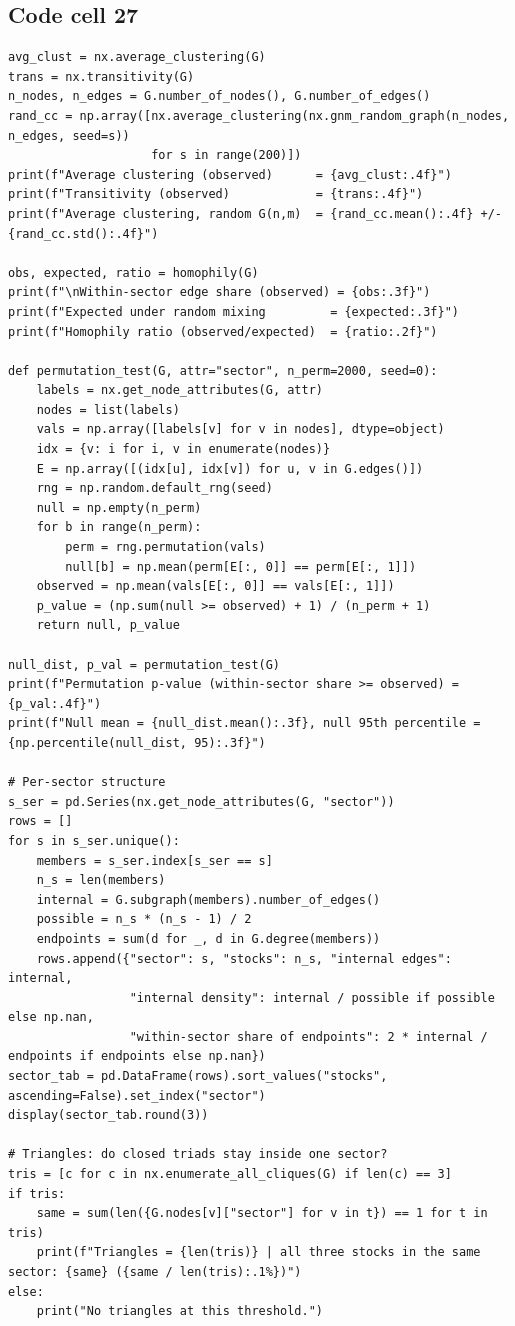 \documentclass[12pt,a4paper]{report}
\begin{document}
\subsection*{Code cell 27}
\begin{lstlisting}[style=fancy]
avg_clust = nx.average_clustering(G)
trans = nx.transitivity(G)
n_nodes, n_edges = G.number_of_nodes(), G.number_of_edges()
rand_cc = np.array([nx.average_clustering(nx.gnm_random_graph(n_nodes, n_edges, seed=s))
                    for s in range(200)])
print(f"Average clustering (observed)      = {avg_clust:.4f}")
print(f"Transitivity (observed)            = {trans:.4f}")
print(f"Average clustering, random G(n,m)  = {rand_cc.mean():.4f} +/- {rand_cc.std():.4f}")

obs, expected, ratio = homophily(G)
print(f"\nWithin-sector edge share (observed) = {obs:.3f}")
print(f"Expected under random mixing         = {expected:.3f}")
print(f"Homophily ratio (observed/expected)  = {ratio:.2f}")

def permutation_test(G, attr="sector", n_perm=2000, seed=0):
    labels = nx.get_node_attributes(G, attr)
    nodes = list(labels)
    vals = np.array([labels[v] for v in nodes], dtype=object)
    idx = {v: i for i, v in enumerate(nodes)}
    E = np.array([(idx[u], idx[v]) for u, v in G.edges()])
    rng = np.random.default_rng(seed)
    null = np.empty(n_perm)
    for b in range(n_perm):
        perm = rng.permutation(vals)
        null[b] = np.mean(perm[E[:, 0]] == perm[E[:, 1]])
    observed = np.mean(vals[E[:, 0]] == vals[E[:, 1]])
    p_value = (np.sum(null >= observed) + 1) / (n_perm + 1)
    return null, p_value

null_dist, p_val = permutation_test(G)
print(f"Permutation p-value (within-sector share >= observed) = {p_val:.4f}")
print(f"Null mean = {null_dist.mean():.3f}, null 95th percentile = {np.percentile(null_dist, 95):.3f}")

# Per-sector structure
s_ser = pd.Series(nx.get_node_attributes(G, "sector"))
rows = []
for s in s_ser.unique():
    members = s_ser.index[s_ser == s]
    n_s = len(members)
    internal = G.subgraph(members).number_of_edges()
    possible = n_s * (n_s - 1) / 2
    endpoints = sum(d for _, d in G.degree(members))
    rows.append({"sector": s, "stocks": n_s, "internal edges": internal,
                 "internal density": internal / possible if possible else np.nan,
                 "within-sector share of endpoints": 2 * internal / endpoints if endpoints else np.nan})
sector_tab = pd.DataFrame(rows).sort_values("stocks", ascending=False).set_index("sector")
display(sector_tab.round(3))

# Triangles: do closed triads stay inside one sector?
tris = [c for c in nx.enumerate_all_cliques(G) if len(c) == 3]
if tris:
    same = sum(len({G.nodes[v]["sector"] for v in t}) == 1 for t in tris)
    print(f"Triangles = {len(tris)} | all three stocks in the same sector: {same} ({same / len(tris):.1%})")
else:
    print("No triangles at this threshold.")
\end{lstlisting}
\end{document}
